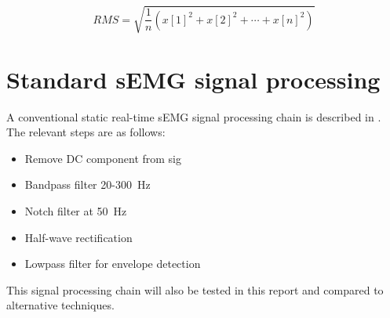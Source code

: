 \begin{equation}
    RMS = \sqrt{\frac{1}{n} (x[1]^2 + x[2]^2 + \cdots + x[n]^2)}
    \label{eq:rms}
\end{equation}

\section{Standard sEMG signal processing}\label{section:standard_semg_processing}
A conventional static real-time sEMG signal processing chain is described in \cite{muscle_force_estimation}. The relevant steps are as follows:
\begin{itemize}
    \item Remove DC component from sig
    \item Bandpass filter 20-\SI{300}{\hertz}
    \item Notch filter at \SI{50}{\hertz}
    \item Half-wave rectification
    \item Lowpass filter for envelope detection
\end{itemize}

This signal processing chain will also be tested in this report and compared to alternative techniques.